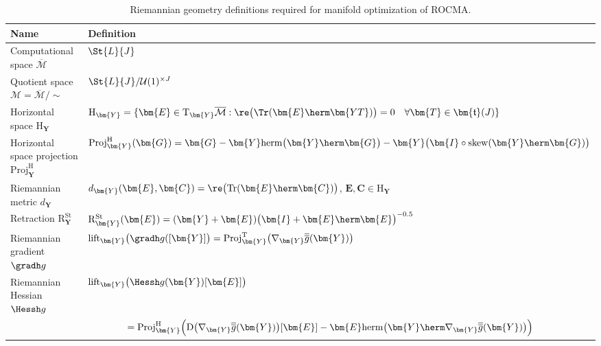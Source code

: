\begin{table}[tbh]
	\small\centering
	\caption{Riemannian geometry definitions required for manifold optimization of ROCMA.} \label{rocma:table:riemmann}
	\begin{tabular}{l|l}
		Name&Definition\\[.15em]\hline
		Computational space $\overline{\mathcal{M}}$   & $\St{L}{J}$\\
		Quotient space $\mathcal{M}=\overline{\mathcal{M}}/{\sim}$   & $\St{L}{J}/\mathcal{U}(1)^{\times J}$\\
		Horizontal space $\mathrm{H}_{\bm{Y}}$ & $\mathrm{H}_{\bm{Y}}=\{\bm{E}\in\mathrm{T}_{\bm{Y}}\overline{\mathcal{M}}: \re\big(\Tr(\bm{E}\herm
		\bm{ YT})\big)=0\quad\forall\bm{T}\in\bm{\mathfrak{t}}(J)\}$\\
		Horizontal space projection $\mathrm{Proj}_{\bm{Y}}^{\mathrm{H}}$& $\mathrm{Proj}_{\bm{Y}}^{\mathrm{H}}(\bm{G})=\bm{G}-\bm{Y}\mathrm{herm}\big(\bm{Y}\herm
		\bm{G}\big)-\bm{Y}\big(\bm{I}\circ\mathrm{skew}(\bm{Y}\herm
		\bm{G})\big)$ \\
		Riemannian metric $d_{\bm{Y}}$ & $d_{\bm{Y}}(\bm{E},\bm{C})=\re\big(\mathrm{Tr}(\bm{E}\herm
		\bm{C})\big)$, $\bm{E},\bm{C}\in\mathrm{H}_{\bm{Y}}$\\
		Retraction $\mathrm{R}_{\bm{Y}}^{\mathrm{St}}$ & $\mathrm{R}_{\bm{Y}}^{\mathrm{St}}(\bm{E})=(\bm{Y}+\bm{E})\big(\bm{I}+\bm{E}\herm
		\bm{E}\big)^{-0.5}$\\
		Riemannian gradient $\gradh g$ & $\mathrm{lift}_{\bm{Y}}\big(\gradh g ([\bm{Y}]\big) =\mathrm{Proj}_{\bm{Y}}^{\mathrm{T}}\big(\nabla_{\bm{Y}}\overline{\overline{g}}(\bm{Y})\big)$\\
		Riemannian Hessian $\Hessh g$ & $\mathrm{lift}_{\bm{Y}}\big(\Hessh g(\bm{Y})[\bm{E}]\big)$\\
		&$\qquad\qquad
		=\mathrm{Proj}_{\bm{Y}}^{\mathrm{H}}\Big(\mathrm{D}\big(\nabla_{\bm{Y}}\overline{\overline{g}}(\bm{Y})\big)[\bm{E}]
		-\bm{E}\mathrm{herm}\big(\bm{Y}\herm\nabla_{\bm{Y}} \overline{\overline{g}}(\bm{Y})\big)\Big)$\\
	\end{tabular}
\end{table}

